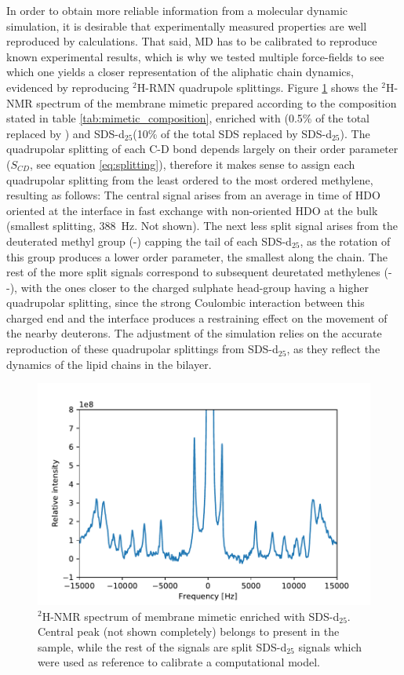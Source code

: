\documentclass[3p,preprint,review]{elsarticle}
\begin{document}
	In order to obtain more reliable information from a molecular dynamic
	simulation,
	it is desirable that experimentally measured properties are well reproduced by
	calculations. That said, MD has to be calibrated to reproduce known experimental
	results, which is why
	we
	tested multiple force-fields to see which one yields a closer representation of
	the aliphatic chain dynamics, evidenced by reproducing $^2$H-RMN quadrupole
	splittings. Figure \ref{fig:reference} shows the $^2$H-NMR spectrum of the
	membrane mimetic prepared according to the composition stated in table
	\ref{tab:mimetic_composition}, enriched with (0.5\% of the total
	 replaced by ) and SDS-d$_{25}$(10\% of the total SDS replaced
	by SDS-d$_{25}$). The quadrupolar splitting of each C-D bond depends largely on
	their order parameter ($S_{CD}$, see equation \ref{eq:splitting}), therefore it
	makes sense to assign each quadrupolar splitting from the least ordered to the
	most ordered methylene, resulting as follows: The central signal arises from an
	average in time of HDO oriented at the interface in fast exchange with
	non-oriented HDO at the bulk (smallest splitting, \SI{388}{Hz}. Not shown). The
	next less split signal arises from the deuterated methyl group (-)
	capping the tail of each SDS-d$_{25}$, as the rotation of this group produces a
	lower order parameter, the smallest along the chain. The rest of the more split
	signals correspond to subsequent deuretated methylenes (--), with the
	ones closer to the charged sulphate head-group having a higher quadrupolar
	splitting, since the strong Coulombic interaction between this charged end and
	the interface produces a restraining effect on the movement of the nearby
	deuterons. The adjustment of the simulation relies on the accurate reproduction
	of these quadrupolar splittings from SDS-d$_{25}$, as they reflect the dynamics
	of the lipid chains in the bilayer.\par
	\begin{figure}[h]
		\centering
		\includegraphics[width=\columnwidth]{nmr_reference}
		\caption{$^2$H-NMR spectrum of membrane mimetic enriched with SDS-d$_{25}$.
			Central peak (not shown completely) belongs to  present in the
			sample, while the rest of the signals are split SDS-d$_{25}$ signals which
			were used as reference to calibrate a computational model.}
		\label{fig:reference}
	\end{figure}
\end{document}
